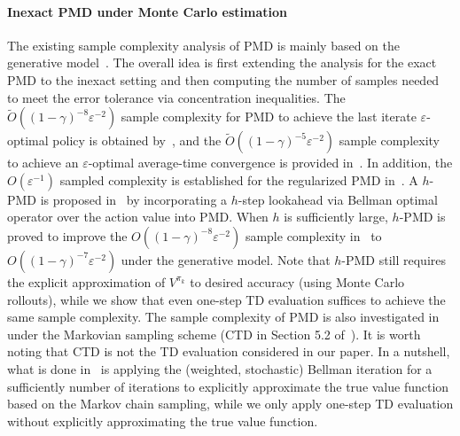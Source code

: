 \documentclass[10pt]{article}
\theoremstyle{plain}
\theoremstyle{definition}
\begin{document}
\paragraph{Inexact PMD under Monte Carlo estimation} {The existing sample complexity analysis of PMD is mainly based on the generative model}~\cite{Lan_2021,Xiao_2022,Johnson_Pike-Burke_Rebeschini_2023,Li_Zhao_Lan_2022,protopapas2024policy}. The overall idea is first extending the analysis for the exact PMD to the inexact setting and then computing the number of samples needed to meet the error tolerance via concentration inequalities. The $\tilde{O}((1-\gamma)^{-8}\varepsilon^{-2})$ sample complexity for PMD to achieve the last iterate  $\varepsilon$-optimal  policy is obtained by~\cite{Xiao_2022,Johnson_Pike-Burke_Rebeschini_2023}, and the $\tilde{O}((1-\gamma)^{-5}\varepsilon^{-2})$ sample complexity to achieve an $\varepsilon$-optimal average-time convergence is provided in~\cite{Lan_2021}. In addition, the $O(\varepsilon^{-1})$  sampled complexity is established  for the regularized PMD in~\cite{Lan_2021}. {A $h$-PMD is proposed in~\cite{protopapas2024policy} by incorporating  a $h$-step lookahead via Bellman optimal operator over the action value into PMD. When $h$ is sufficiently large, $h$-PMD is proved to improve the $O((1-\gamma)^{-8}\varepsilon^{-2})$ sample complexity in~\cite{Xiao_2022} to $O((1-\gamma)^{-7}\varepsilon^{-2})$ under the generative model. Note that $h$-PMD still requires the explicit approximation of $V^{\pi_k}$ to desired accuracy (using Monte Carlo rollouts), while we show that even one-step TD evaluation suffices to achieve the same sample complexity.  The  sample complexity of PMD is also investigated in~\cite{Lan_2021,li2024stochastic} under the Markovian sampling scheme (CTD in Section 5.2 of~\cite{Lan_2021}). It is worth noting that CTD is not the TD evaluation considered in our paper. In a nutshell, what is done in~\cite{Lan_2021,li2024stochastic} is applying the (weighted, stochastic) Bellman iteration for a sufficiently number of iterations to explicitly approximate the true value function based on the Markov chain sampling, while we only apply one-step TD evaluation without explicitly approximating the true value function.}
\end{document}
